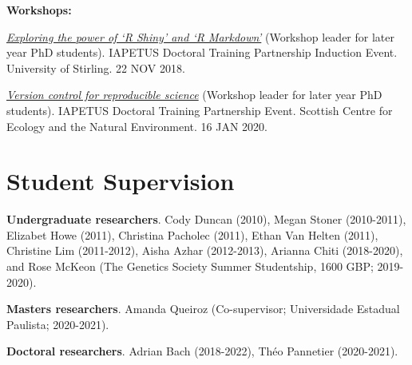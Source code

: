 \documentclass[letterpaper]{article}
\renewenvironment{itemize}{
  \begin{list}{}{
    \setlength{\leftmargin}{1.5em}
  }
}{
  \end{list}
}
\begin{document}
\begin{itemize}
\item {\bf Workshops:}
\begin{itemize}
\item[$\bullet$]{{\it \href{https://bradduthie.github.io/blog/Manuscripts-in-Rmarkdown/}{Exploring the power of `R Shiny' and `R Markdown'}} (Workshop leader for later year PhD students). IAPETUS Doctoral Training Partnership Induction Event. University of Stirling. 22 NOV 2018.}
\item[$\bullet$]{{\it \href{https://bradduthie.github.io/version_control/vc_notes.html}{Version control for reproducible science}} (Workshop leader for later year PhD students). IAPETUS Doctoral Training Partnership Event. Scottish Centre for Ecology and the Natural Environment. 16 JAN 2020.}
\end{itemize}

\end{itemize}

\section*{Student Supervision}
\begin{itemize}
\item {\bf Undergraduate researchers}. Cody Duncan (2010), Megan Stoner (2010-2011), Elizabet Howe (2011), Christina Pacholec (2011), Ethan Van Helten (2011), Christine Lim (2011-2012), Aisha Azhar (2012-2013), Arianna Chiti (2018-2020), and Rose McKeon (The Genetics Society Summer Studentship, 1600 GBP; 2019-2020).
\item {\bf Masters researchers}. Amanda Queiroz (Co-supervisor; Universidade Estadual Paulista; 2020-2021).
\item {\bf Doctoral researchers}. Adrian Bach (2018-2022), Th\'{e}o Pannetier (2020-2021).
\end{itemize}
\end{document}
